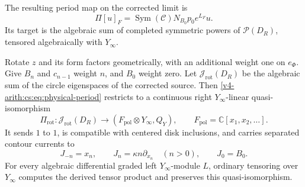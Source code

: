 The resulting period map on the corrected limit is
\begin{equation}
 \Pi[u]_F=\operatorname{Sym}(\mathcal C)
               N_{B_0}p_0e^{L_F}u.
 \label{v4-arith:cs:eq:physical-period}
\end{equation}
Its target is the algebraic sum of completed symmetric powers of \(\mathscr
P(D_R)\), tensored algebraically with \(Y_\infty\).

\begin{theorem}
\label{v4-arith:cs:thm:physical-period}
Rotate \(z\) and its form factors geometrically, with an additional weight
one on \(e_\Phi\). Give \(B_n\) and \(c_{n-1}\) weight \(n\), and \(B_0\)
weight zero. Let \(\mathcal J_{\mathrm{rot}}(D_R)\) be the algebraic sum of
the circle eigenspaces of the corrected source. Then
\eqref{v4-arith:cs:eq:physical-period} restricts to a continuous right
\(Y_\infty\)-linear quasi-isomorphism
\begin{equation}
 \Pi_{\mathrm{rot}}:\mathcal J_{\mathrm{rot}}(D_R)
       \longrightarrow
 (F_{\mathrm{pol}}\otimes Y_\infty,Q_Y),
 \qquad F_{\mathrm{pol}}=\mathbb C[x_1,x_2,\ldots].
 \label{v4-arith:cs:eq:polynomial-period}
\end{equation}
It sends \(1\) to \(1\), is compatible with centered disk inclusions, and
carries separated contour currents to
\begin{equation}
 J_{-n}=x_n,\qquad J_n=\kappa n\partial_{x_n}\quad(n>0),
 \qquad J_0=B_0.
 \label{v4-arith:cs:eq:current-modes}
\end{equation}
For every algebraic differential graded left \(Y_\infty\)-module \(L\),
ordinary tensoring over \(Y_\infty\) computes the derived tensor product and
preserves this quasi-isomorphism.
\end{theorem}

